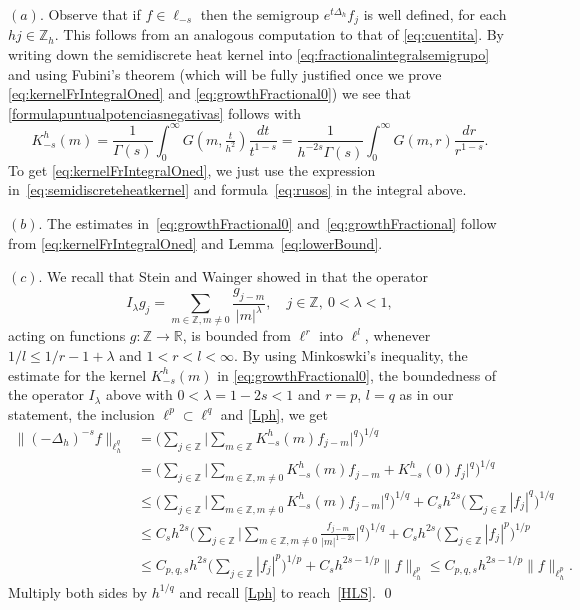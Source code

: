 \documentclass[a4paper,11pt,reqno]{amsart}
\newcommand{\R}{\mathbb{R}}
\newcommand{\Z}{\mathbb{Z}}
\theoremstyle{definition}
\numberwithin{equation}{section}
\begin{document}
\noindent$(a)$. Observe that if $f\in\ell_{-s}$ then the semigroup $e^{t\Delta_h}f_j$
is well defined, for each $hj\in\Z_h$. This follows from an analogous computation
to that of \eqref{eq:cuentita}.
By writing down the semidiscrete heat kernel into
\eqref{eq:fractionalintegralsemigrupo} and using Fubini's theorem
(which will be fully justified once we prove \eqref{eq:kernelFrIntegralOned}
and \eqref{eq:growthFractional0}) we see that \eqref{formulapuntualpotenciasnegativas}
follows with
$$
K^h_{-s}(m) = \frac{1}{\Gamma(s)} \int_0^{\infty}G(m,\tfrac{t}{h^2})\frac{dt}{t^{1-s}}
= \frac{1}{h^{-2s}\Gamma(s)}\int_0^{\infty}G(m,r)\frac{dr}{r^{1-s}}.
$$
To get \eqref{eq:kernelFrIntegralOned}, we just use the expression in~\eqref{eq:semidiscreteheatkernel}
and formula~\eqref{eq:rusos} in the integral above.

\noindent$(b)$. The estimates in~\eqref{eq:growthFractional0}
and~\eqref{eq:growthFractional} follow from \eqref{eq:kernelFrIntegralOned} and Lemma~\ref{eq:lowerBound}.

\noindent$(c)$. We recall that Stein and Wainger
showed in \cite[Proposition~(a)]{Stein-Wainger} that the operator
$$
I_\lambda g_j=\sum_{m\in\Z,m\neq 0}\frac{g_{j-m}}{|m|^\lambda},\quad j\in\Z,~0<\lambda<1,
$$
acting on functions $g:\Z\to\R$, is bounded from $\ell^r$ into $\ell^l$, whenever
$1/l\leq 1/r-1+\lambda$ and $1<r<l<\infty$.
By using Minkoswki's inequality,
the estimate for the kernel $K^h_{-s}(m)$ in \eqref{eq:growthFractional0},
the boundedness of the operator $I_\lambda$
above with $0<\lambda=1-2s<1$ and $r=p$, $l=q$ as in our statement,
the inclusion $\ell^p\subset\ell^q$ and \eqref{Lph}, we get
\begin{align*}
\|(-\Delta_h)^{-s}f\|_{\ell^q_h} &=\bigg(\sum_{j\in \Z}\bigg|\sum_{m\in \Z}K^h_{-s}(m)f_{j-m}\bigg|^q\bigg)^{1/q} \\
&=\bigg(\sum_{j\in\Z}\bigg|\sum_{m\in\Z,m\neq0}K^h_{-s}(m)f_{j-m}+K_{-s}^h(0)f_{j}\bigg|^q\bigg)^{1/q}\\
&\le\bigg(\sum_{j\in \Z}\bigg|\sum_{m\in \Z,m\neq0}K^h_{-s}(m)f_{j-m}\bigg|^q\Bigg)^{1/q}
+C_sh^{2s}\bigg(\sum_{j\in\Z}|f_j|^q\bigg)^{1/q}\\
&\le C_sh^{2s}\bigg(\sum_{j\in \Z}\bigg|\sum_{m\in \Z,m\neq 0}\frac{f_{j-m}}{|m|^{1-2s}}\bigg|^q\bigg)^{1/q}
+C_sh^{2s}\bigg(\sum_{j\in\Z}|f_j|^p\bigg)^{1/p}\\
&\le C_{p,q,s}h^{2s}\bigg(\sum_{j\in\Z}|f_j|^p\bigg)^{1/p}+C_sh^{2s-1/p}\|f\|_{\ell^p_h}
\le C_{p,q,s}h^{2s-1/p}\|f\|_{\ell^p_h}.
\end{align*}
Multiply both sides by $h^{1/q}$ and recall \eqref{Lph} to reach~\eqref{HLS}.
\qed
\end{document}
